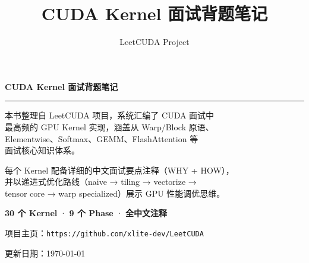 \documentclass[9pt]{ctexart}
\title{CUDA Kernel 面试背题笔记}
\author{LeetCUDA Project}
\date{}
\begin{document}
\begin{titlepage}
\thispagestyle{empty}
\begin{center}
  \vspace*{5.0cm}
  {\fontsize{28pt}{36pt}\selectfont\bfseries CUDA Kernel 面试背题笔记}

  \vspace{0.5cm}
  \rule{0.6\textwidth}{0.5pt}

  \vspace{1.5cm}
  {\fontsize{12pt}{18pt}\selectfont
  本书整理自 LeetCUDA 项目，系统汇编了 CUDA 面试中 \\
  最高频的 GPU Kernel 实现，涵盖从 Warp/Block 原语、 \\
  Elementwise、Softmax、GEMM、FlashAttention 等 \\
  面试核心知识体系。

  \vspace{0.6cm}
  每个 Kernel 配备详细的中文面试要点注释（WHY + HOW）， \\
  并以递进式优化路线（naive → tiling → vectorize → \\
  tensor core → warp specialized）展示 GPU 性能调优思维。

  \vspace{0.6cm}
  \textbf{30 个 Kernel} · \textbf{9 个 Phase} · \textbf{全中文注释}
  }

  \vspace{2.5cm}
  {\fontsize{11pt}{16pt}\selectfont
   项目主页：\texttt{https://github.com/xlite-dev/LeetCUDA}
  }

  \vspace{0.3cm}
  {\fontsize{10pt}{14pt}\selectfont\color{gray}
   更新日期：\today
  }
\end{center}
\vfill
\end{titlepage}

\setcounter{page}{1}

\end{document}
